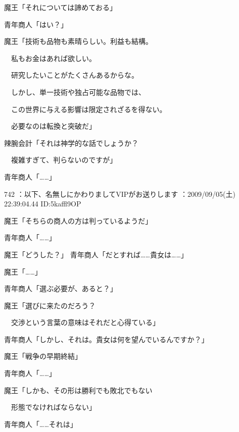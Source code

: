 \documentclass[a4j,twocolumn]{tarticle}
\begin{document}
魔王「それについては諦めておる」 



青年商人「はい？」 



魔王「技術も品物も素晴らしい。利益も結構。\par{} 
　私もお金はあれば欲しい。\par{} 
　研究したいことがたくさんあるからな。\par{} 
　しかし、単一技術や独占可能な品物では、\par{} 
　この世界に与える影響は限定されざるを得ない。\par{} 
　必要なのは転換と突破だ」 



辣腕会計「それは神学的な話でしょうか？\par{} 
　複雑すぎて、判らないのですが」 



青年商人「……」 

	
    
    

742 ：以下、名無しにかわりましてVIPがお送りします ：2009/09/05(土) 22:39:04.44 ID:5kaffl9OP 


魔王「そちらの商人の方は判っているようだ」\par{} 
青年商人「……」 



魔王「どうした？」 
青年商人「だとすれば……貴女は……」 



魔王「……」 



青年商人「選ぶ必要が、あると？」 



魔王「選びに来たのだろう？ \par{}
　交渉という言葉の意味はそれだと心得ている」 



青年商人「しかし、それは。貴女は何を望んでいるんですか？」 



魔王「戦争の早期終結」\par{} 
青年商人「……」 



魔王「しかも、その形は勝利でも敗北でもない\par{} 
　形態でなければならない」 



青年商人「……それは」 
\end{document}
